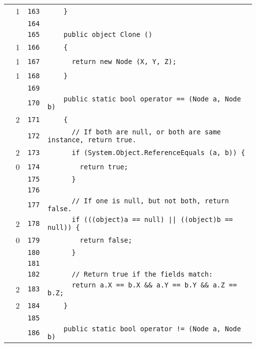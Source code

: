 \documentclass[a4paper,10pt]{article}
\begin{document}
\begin{longtable}[l]{lrrl}
\cellcolor{green} & 1 & \verb~163~ & \verb~    }~\\
\cellcolor{gray} &  & \verb~164~ & \verb~~\\
\cellcolor{gray} &  & \verb~165~ & \verb~    public object Clone ()~\\
\cellcolor{green} & 1 & \verb~166~ & \verb~    {~\\
\cellcolor{green} & 1 & \verb~167~ & \verb~      return new Node (X, Y, Z);~\\
\cellcolor{green} & 1 & \verb~168~ & \verb~    }~\\
\cellcolor{gray} &  & \verb~169~ & \verb~~\\
\cellcolor{gray} &  & \verb~170~ & \verb~    public static bool operator == (Node a, Node b)~\\
\cellcolor{green} & 2 & \verb~171~ & \verb~    {~\\
\cellcolor{gray} &  & \verb~172~ & \verb~      // If both are null, or both are same instance, return true.~\\
\cellcolor{green} & 2 & \verb~173~ & \verb~      if (System.Object.ReferenceEquals (a, b)) {~\\
\cellcolor{red} & 0 & \verb~174~ & \verb~        return true;~\\
\cellcolor{gray} &  & \verb~175~ & \verb~      }~\\
\cellcolor{gray} &  & \verb~176~ & \verb~~\\
\cellcolor{gray} &  & \verb~177~ & \verb~      // If one is null, but not both, return false.~\\
\cellcolor{green} & 2 & \verb~178~ & \verb~      if (((object)a == null) || ((object)b == null)) {~\\
\cellcolor{red} & 0 & \verb~179~ & \verb~        return false;~\\
\cellcolor{gray} &  & \verb~180~ & \verb~      }~\\
\cellcolor{gray} &  & \verb~181~ & \verb~~\\
\cellcolor{gray} &  & \verb~182~ & \verb~      // Return true if the fields match:~\\
\cellcolor{green} & 2 & \verb~183~ & \verb~      return a.X == b.X && a.Y == b.Y && a.Z == b.Z;~\\
\cellcolor{green} & 2 & \verb~184~ & \verb~    }~\\
\cellcolor{gray} &  & \verb~185~ & \verb~~\\
\cellcolor{gray} &  & \verb~186~ & \verb~    public static bool operator != (Node a, Node b)~\\

\end{longtable}
\end{document}
